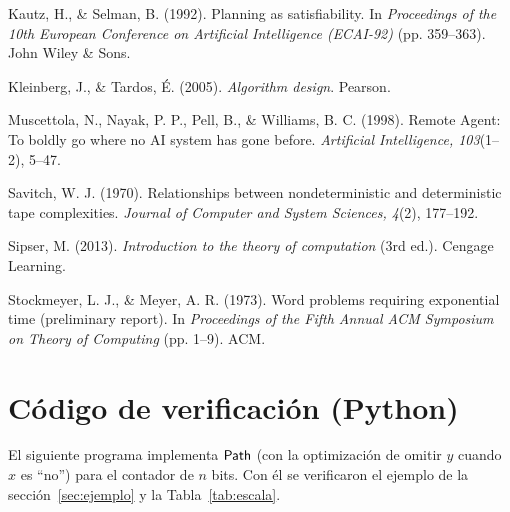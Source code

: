 \documentclass[11pt,letterpaper]{article}
\theoremstyle{plain}
\theoremstyle{definition}
\theoremstyle{remark}
\newcommand{\nombreMat}[1]{\ensuremath{\text{\fontencoding{OT1}\fontfamily{cmss}\upshape\selectfont #1}}}
\newcommand{\Path}{\nombreMat{Path}}
\begin{document}
\begin{list}{}{\setlength{\leftmargin}{1.27cm}\setlength{\itemindent}{-1.27cm}\setlength{\labelwidth}{0pt}\setlength{\labelsep}{0pt}\setlength{\itemsep}{6pt}\setlength{\parsep}{0pt}}
\item Kautz, H., \& Selman, B. (1992). Planning as satisfiability. In \textit{Proceedings of the 10th European Conference on Artificial Intelligence (ECAI-92)} (pp. 359--363). John Wiley \& Sons.

\item Kleinberg, J., \& Tardos, É. (2005). \textit{Algorithm design}. Pearson.

\item Muscettola, N., Nayak, P. P., Pell, B., \& Williams, B. C. (1998). Remote Agent: To boldly go where no AI system has gone before. \textit{Artificial Intelligence, 103}(1--2), 5--47.

\item Savitch, W. J. (1970). Relationships between nondeterministic and deterministic tape complexities. \textit{Journal of Computer and System Sciences, 4}(2), 177--192.

\item Sipser, M. (2013). \textit{Introduction to the theory of computation} (3rd ed.). Cengage Learning.

\item Stockmeyer, L. J., \& Meyer, A. R. (1973). Word problems requiring exponential time (preliminary report). In \textit{Proceedings of the Fifth Annual ACM Symposium on Theory of Computing} (pp. 1--9). ACM.
\end{list}

\clearpage
\appendix
\section{Código de verificación (Python)}

El siguiente programa implementa $\Path$ (con la optimización de omitir $y$ cuando $x$ es ``no'') para el contador de $n$ bits. Con él se verificaron el ejemplo de la sección~\ref{sec:ejemplo} y la Tabla~\ref{tab:escala}.
\end{document}
